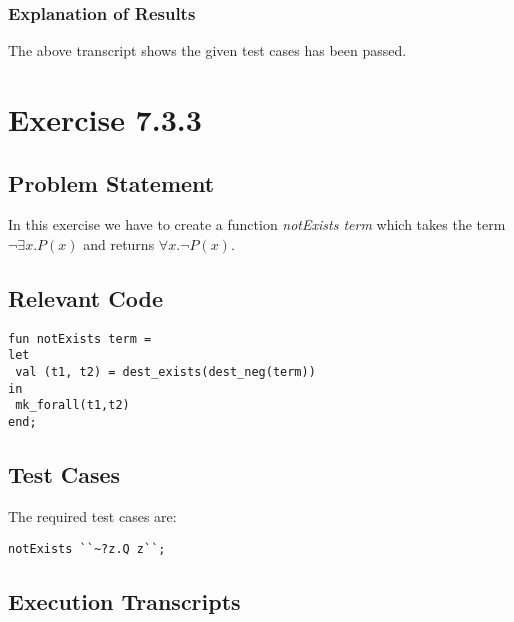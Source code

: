 \documentclass{report}
\begin{document}
\subsection{Explanation of Results}
\label{sec:explanation-results-2}

The above transcript shows the given test cases has been passed.



\chapter{Exercise 7.3.3}
\label{cha:exercise-7.3.3}

\section{Problem Statement}
\label{sec:problem-statement-3}
In this exercise we have to create a function \emph{notExists term} which takes the term  $\neg \exists x.P(x)$ and returns $\forall x.\neg P(x)$.

\section{Relevant Code}
\label{sec:relevant-code-3}

\lstset{frameround=tttt}
\begin{lstlisting}[frame=tRBL]
fun notExists term =
let 
 val (t1, t2) = dest_exists(dest_neg(term))
in
 mk_forall(t1,t2)
end;

\end{lstlisting}

\section{Test Cases}
\label{sec:test-cases-3}

The required test cases are:
\begin{lstlisting}[frame = tRBL ]
notExists ``~?z.Q z``;
\end{lstlisting}


\section{Execution Transcripts}
\label{sec:exec-transcr-3}
\end{document}
